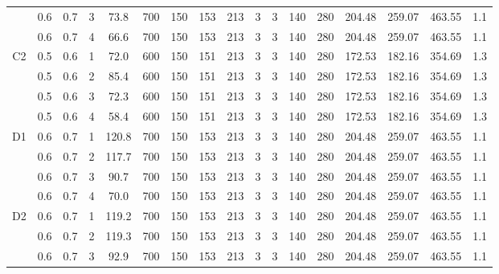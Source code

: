 \begin{table}[H]
{\begin{tabular}{|c|c|c|r|c|c|c|c|c|c|c|c|c|c|c|c|c|}
\cline{2-17}          & 0.6   & 0.7   & 3     & 73.8  & 700   & 150   & 153   & 213   & 3     & 3     & 140   & 280   & 204.48 & 259.07 & 463.55 & 1.1 \bigstrut\\
\cline{2-17}          & 0.6   & 0.7   & 4     & 66.6  & 700   & 150   & 153   & 213   & 3     & 3     & 140   & 280   & 204.48 & 259.07 & 463.55 & 1.1 \bigstrut\\
    \hline
    \multirow{4}[8]{*}{C2} & 0.5   & 0.6   & 1     & 72.0  & 600   & 150   & 151   & 213   & 3     & 3     & 140   & 280   & 172.53 & 182.16 & 354.69 & 1.3 \bigstrut\\
\cline{2-17}          & 0.5   & 0.6   & 2     & 85.4  & 600   & 150   & 151   & 213   & 3     & 3     & 140   & 280   & 172.53 & 182.16 & 354.69 & 1.3 \bigstrut\\
\cline{2-17}          & 0.5   & 0.6   & 3     & 72.3  & 600   & 150   & 151   & 213   & 3     & 3     & 140   & 280   & 172.53 & 182.16 & 354.69 & 1.3 \bigstrut\\
\cline{2-17}          & 0.5   & 0.6   & 4     & 58.4  & 600   & 150   & 151   & 213   & 3     & 3     & 140   & 280   & 172.53 & 182.16 & 354.69 & 1.3 \bigstrut\\
    \hline
    \multirow{4}[8]{*}{D1} & 0.6   & 0.7   & 1     & 120.8 & 700   & 150   & 153   & 213   & 3     & 3     & 140   & 280   & 204.48 & 259.07 & 463.55 & 1.1 \bigstrut\\
\cline{2-17}          & 0.6   & 0.7   & 2     & 117.7 & 700   & 150   & 153   & 213   & 3     & 3     & 140   & 280   & 204.48 & 259.07 & 463.55 & 1.1 \bigstrut\\
\cline{2-17}          & 0.6   & 0.7   & 3     & 90.7  & 700   & 150   & 153   & 213   & 3     & 3     & 140   & 280   & 204.48 & 259.07 & 463.55 & 1.1 \bigstrut\\
\cline{2-17}          & 0.6   & 0.7   & 4     & 70.0  & 700   & 150   & 153   & 213   & 3     & 3     & 140   & 280   & 204.48 & 259.07 & 463.55 & 1.1 \bigstrut\\
    \hline
    \multirow{4}[8]{*}{D2} & 0.6   & 0.7   & 1     & 119.2 & 700   & 150   & 153   & 213   & 3     & 3     & 140   & 280   & 204.48 & 259.07 & 463.55 & 1.1 \bigstrut\\
\cline{2-17}          & 0.6   & 0.7   & 2     & 119.3 & 700   & 150   & 153   & 213   & 3     & 3     & 140   & 280   & 204.48 & 259.07 & 463.55 & 1.1 \bigstrut\\
\cline{2-17}          & 0.6   & 0.7   & 3     & 92.9  & 700   & 150   & 153   & 213   & 3     & 3     & 140   & 280   & 204.48 & 259.07 & 463.55 & 1.1 \bigstrut\\

\end{tabular}}
\end{table}
